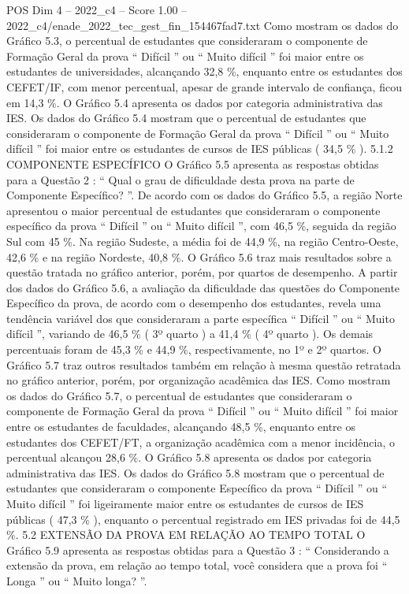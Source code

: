 \begin{textsample}{POS Dim 4 – 2022\_c4 – Score 1.00 – 2022\_c4/enade\_2022\_tec\_gest\_fin\_154467fad7.txt}
Como mostram os dados do Gráfico 5.3, o percentual de estudantes que consideraram o componente de Formação Geral da prova “ Difícil ” ou “ Muito difícil ” foi maior entre os estudantes de universidades, alcançando 32,8 \%, enquanto entre os estudantes dos CEFET/IF, com menor percentual, apesar de grande intervalo de confiança, ficou em 14,3 \%.
O Gráfico 5.4 apresenta os dados por categoria administrativa das IES.
Os dados do Gráfico 5.4 mostram que o percentual de estudantes que consideraram o componente de Formação Geral da prova “ Difícil ” ou “ Muito difícil ” foi maior entre os estudantes de cursos de IES públicas ( 34,5 \% ). 5.1.2 COMPONENTE ESPECÍFICO O Gráfico 5.5 apresenta as respostas obtidas para a Questão 2 : “ Qual o grau de dificuldade desta prova na parte de Componente Específico? ”.
De acordo com os dados do Gráfico 5.5, a região Norte apresentou o maior percentual de estudantes que consideraram o componente específico da prova “ Difícil ” ou “ Muito difícil ”, com 46,5 \%, seguida da região Sul com 45 \%.
Na região Sudeste, a média foi de 44,9 \%, na região Centro-Oeste, 42,6 \% e na região Nordeste, 40,8 \%.
O Gráfico 5.6 traz mais resultados sobre a questão tratada no gráfico anterior, porém, por quartos de desempenho.
A partir dos dados do Gráfico 5.6, a avaliação da dificuldade das questões do Componente Específico da prova, de acordo com o desempenho dos estudantes, revela uma tendência variável dos que consideraram a parte específica “ Difícil ” ou “ Muito difícil ”, variando de 46,5 \% ( 3º quarto ) a 41,4 \% ( 4º quarto ).
Os demais percentuais foram de 45,3 \% e 44,9 \%, respectivamente, no 1º e 2º quartos.
O Gráfico 5.7 traz outros resultados também em relação à mesma questão retratada no gráfico anterior, porém, por organização acadêmica das IES.
Como mostram os dados do Gráfico 5.7, o percentual de estudantes que consideraram o componente de Formação Geral da prova “ Difícil ” ou “ Muito difícil ” foi maior entre os estudantes de faculdades, alcançando 48,5 \%, enquanto entre os estudantes dos CEFET/FT, a organização acadêmica com a menor incidência, o percentual alcançou 28,6 \%.
O Gráfico 5.8 apresenta os dados por categoria administrativa das IES.
Os dados do Gráfico 5.8 mostram que o percentual de estudantes que consideraram o componente Específico da prova “ Difícil ” ou “ Muito difícil ” foi ligeiramente maior entre os estudantes de cursos de IES públicas ( 47,3 \% ), enquanto o percentual registrado em IES privadas foi de 44,5 \%. 5.2 EXTENSÃO DA PROVA EM RELAÇÃO AO TEMPO TOTAL O Gráfico 5.9 apresenta as respostas obtidas para a Questão 3 : “ Considerando a extensão da prova, em relação ao tempo total, você considera que a prova foi “ Longa ” ou “ Muito longa? ”.

\end{textsample}

